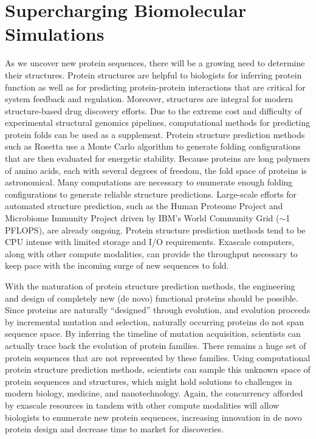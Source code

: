 \section{Supercharging Biomolecular Simulations}
\par As we uncover new protein sequences, there will be a growing need to determine their structures. Protein structures are helpful to biologists for inferring protein function as well as for predicting protein-protein interactions that are critical for system feedback and regulation. Moreover, structures are integral for modern structure-based drug discovery efforts. Due to the extreme cost and difficulty of experimental structural genomics pipelines, computational methods for predicting protein folds can be used as a supplement. Protein structure prediction methods such as Rosetta use a Monte Carlo algorithm to generate folding configurations that are then evaluated for energetic stability\cite{Huang2016}. Because proteins are long polymers of amino acids, each with several degrees of freedom, the fold space of proteins is astronomical. Many computations are necessary to enumerate enough folding configurations to generate reliable structure predictions. Large-scale efforts for automated structure prediction, such as the Human Proteome Project and Microbiome Immunity Project driven by IBM's World Community Grid ($\sim$1 PFLOPS), are already ongoing. Protein structure prediction methods tend to be CPU intense with limited storage and I/O requirements. Exascale computers, along with other compute modalities, can provide the throughput necessary to keep pace with the incoming surge of new sequences to fold.
\par With the maturation of protein structure prediction methods, the engineering and design of completely new (de novo) functional proteins should be possible. Since proteins are naturally ``designed'' through evolution, and evolution proceeds by incremental mutation and selection, naturally occurring proteins do not span sequence space. By inferring the timeline of mutation acquisition, scientists can actually trace back the evolution of protein families. There remains a huge set of protein sequences that are not represented by these families\cite{Huang2016}. Using computational protein structure prediction methods, scientists can sample this unknown space of protein sequences and structures, which might hold solutions to challenges in modern biology, medicine, and nanotechnology. Again, the concurrency afforded by exascale resources in tandem with other compute modalities will allow biologists to enumerate new protein sequences, increasing innovation in de novo protein design and decrease time to market for discoveries.
